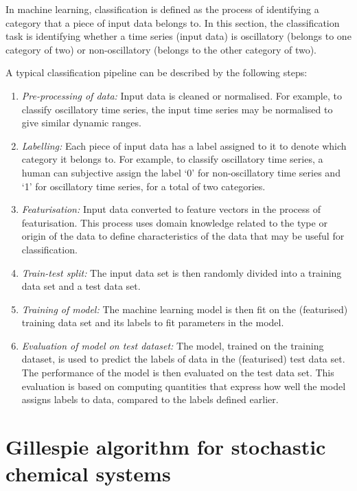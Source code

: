 In machine learning, classification is defined as the process of identifying a category that a piece of input data belongs to.
In this section, the classification task is identifying whether a time series (input data) is oscillatory (belongs to one category of two) or non-oscillatory (belongs to the other category of two).

A typical classification pipeline can be described by the following steps:
\begin{enumerate}
  \item \emph{Pre-processing of data:} Input data is cleaned or normalised.
        For example, to classify oscillatory time series, the input time series may be normalised to give similar dynamic ranges.
  \item \emph{Labelling:} Each piece of input data has a label assigned to it to denote which category it belongs to.
        For example, to classify oscillatory time series, a human can subjective assign the label `0' for non-oscillatory time series and `1' for oscillatory time series, for a total of two categories.
  \item \emph{Featurisation:} Input data converted to feature vectors in the process of featurisation.
        This process uses domain knowledge related to the type or origin of the data to define characteristics of the data that may be useful for classification.
  \item \emph{Train-test split:} The input data set is then randomly divided into a training data set and a test data set.
  \item \emph{Training of model:} The machine learning model is then fit on the (featurised) training data set and its labels to fit parameters in the model.
  \item \emph{Evaluation of model on test dataset:}
        The model, trained on the training dataset, is used to predict the labels of data in the (featurised) test data set.
        The performance of the model is then evaluated on the test data set.
        This evaluation is based on computing quantities that express how well the model assigns labels to data, compared to the labels defined earlier.
\end{enumerate}


\section{Gillespie algorithm for stochastic chemical systems}
\label{append:analysis-gillespie}


